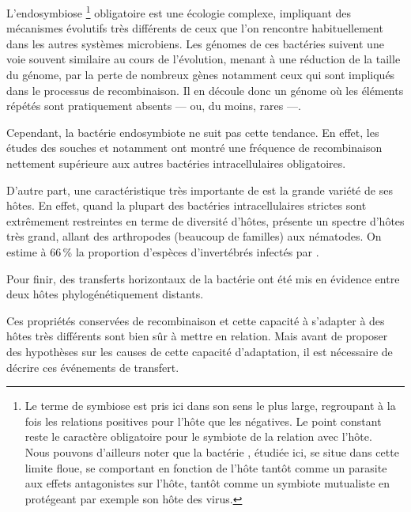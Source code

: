 L'endosymbiose%
\footnote{Le terme de symbiose est pris ici dans son sens le plus large,
regroupant à la fois les relations positives pour l'hôte que les négatives. Le
point constant reste le caractère obligatoire pour le symbiote de la relation
avec l'hôte.\\ Nous pouvons d'ailleurs noter que la bactérie ,
étudiée ici, se situe dans cette limite floue, se comportant en fonction de
l'hôte tantôt comme un parasite aux effets antagonistes sur
l'hôte\cite{Werren2008}, tantôt comme un symbiote mutualiste en protégeant par exemple
son hôte des virus.}
obligatoire est une écologie complexe, impliquant des mécanismes évolutifs
très différents de ceux que l'on rencontre habituellement dans les autres
systèmes microbiens. Les génomes de ces bactéries suivent une voie souvent
similaire au cours de l'évolution, menant à une réduction de la taille du
génome, par la perte de nombreux gènes\cite{wernegreen2002} notamment ceux qui
sont impliqués dans le processus de recombinaison. Il en découle donc un
génome où les éléments répétés sont pratiquement absents --- ou, du moins,
rares\cite{Bordenstein2005} ---.

Cependant, la bactérie endosymbiote  ne suit pas cette
tendance. En effet, les études des souches  et  notamment
ont montré une fréquence de recombinaison nettement supérieure aux autres
bactéries intracellulaires obligatoires\cite{Wu2004}.

D'autre part, une caractéristique très importante de  est la
grande variété de ses hôtes.  En effet, quand la plupart des bactéries
intracellulaires strictes sont extrêmement restreintes en terme de diversité
d'hôtes,  présente un spectre d'hôtes très grand, allant des
arthropodes (beaucoup de familles) aux nématodes. On estime à 66\,\% la
proportion d'espèces d'invertébrés infectés par
\cite{hilgenboecker2008}.

Pour finir, des transferts horizontaux de la bactérie ont été mis en évidence
\cite{vavre1999} entre deux hôtes phylogénétiquement distants.

Ces propriétés conservées de recombinaison et cette capacité à s'adapter à des
hôtes très différents sont bien sûr à mettre en relation.
Mais avant de proposer des hypothèses sur les causes de cette capacité
d'adaptation, il est nécessaire de décrire ces événements de transfert.

